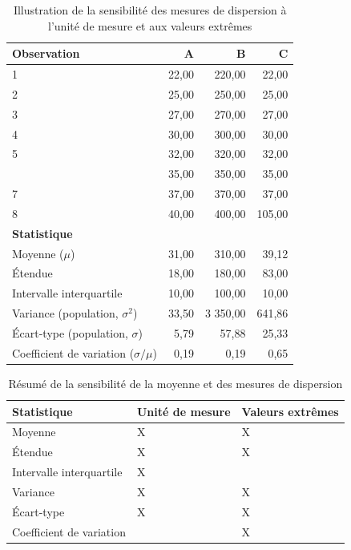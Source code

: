 \documentclass[
  11pt,
  french,
]{book}
\begin{document}
\begin{table}

\caption{\label{tab:datavar2}Illustration de la sensibilité des mesures de dispersion à l'unité de mesure et aux valeurs extrêmes}
\centering
\fontsize{8}{10}\selectfont
\begin{tabular}[t]{lrrr}
\toprule
Observation & A & B & C\\
\midrule
1 & 22,00 & 220,00 & 22,00\\
2 & 25,00 & 250,00 & 25,00\\
3 & 27,00 & 270,00 & 27,00\\
4 & 30,00 & 300,00 & 30,00\\
5 & 32,00 & 320,00 & 32,00\\
\addlinespace
6 & 35,00 & 350,00 & 35,00\\
7 & 37,00 & 370,00 & 37,00\\
8 & 40,00 & 400,00 & 105,00\\
\textbf{Statistique} &  &  & \\
Moyenne ($\mu$) & 31,00 & 310,00 & 39,12\\
\addlinespace
Étendue & 18,00 & 180,00 & 83,00\\
Intervalle interquartile & 10,00 & 100,00 & 10,00\\
Variance (population, $\sigma^2$) & 33,50 & 3 350,00 & 641,86\\
Écart-type (population, $\sigma$) & 5,79 & 57,88 & 25,33\\
Coefficient de variation ($\sigma / \mu$) & 0,19 & 0,19 & 0,65\\
\bottomrule
\end{tabular}
\end{table}

\begin{table}

\caption{\label{tab:resume}Résumé de la sensibilité de la moyenne et des mesures de dispersion}
\centering
\fontsize{8}{10}\selectfont
\begin{tabular}[t]{lll}
\toprule
Statistique & Unité de mesure & Valeurs extrêmes\\
\midrule
Moyenne & X & X\\
Étendue & X & X\\
Intervalle interquartile & X & \\
Variance & X & X\\
Écart-type & X & X\\
\addlinespace
Coefficient de variation &  & X\\
\bottomrule
\end{tabular}
\end{table}
\end{document}
